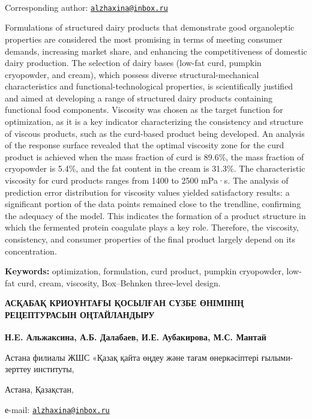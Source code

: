 {\bfseries \textsuperscript{\envelope }}Corresponding author:
\href{mailto:alzhaxina@inbox.ru}{\nolinkurl{alzhaxina@inbox.ru}}

Formulations of structured dairy products that demonstrate good
organoleptic properties are considered the most promising in terms of
meeting consumer demands, increasing market share, and enhancing the
competitiveness of domestic dairy production. The selection of dairy
bases (low-fat curd, pumpkin cryopowder, and cream), which possess
diverse structural-mechanical characteristics and
functional-technological properties, is scientifically justified and
aimed at developing a range of structured dairy products containing
functional food components. Viscosity was chosen as the target function
for optimization, as it is a key indicator characterizing the
consistency and structure of viscous products, such as the curd-based
product being developed. An analysis of the response surface revealed
that the optimal viscosity zone for the curd product is achieved when
the mass fraction of curd is 89.6\%, the mass fraction of cryopowder is
5.4\%, and the fat content in the cream is 31.3\%. The characteristic
viscosity for curd products ranges from 1400 to 2500 mPa·s. The analysis
of prediction error distribution for viscosity values yielded
satisfactory results: a significant portion of the data points remained
close to the trendline, confirming the adequacy of the model. This
indicates the formation of a product structure in which the fermented
protein coagulate plays a key role. Therefore, the viscosity,
consistency, and consumer properties of the final product largely depend
on its concentration.

{\bfseries Keywords:} optimization, formulation, curd product, pumpkin
cryopowder, low-fat curd, cream, viscosity, Box--Behnken three-level
design.

{\bfseries АСҚАБАҚ КРИОҰНТАҒЫ ҚОСЫЛҒАН СҮЗБЕ ӨНІМІНІҢ РЕЦЕПТУРАСЫН
ОҢТАЙЛАНДЫРУ}

{\bfseries Н.E. Альжаксина\textsuperscript{\envelope }, А.Б. Далабаев, И.Е.
Аубакирова, М.С. Мантай}

Астана филиалы ЖШС «Қазақ қайта өңдеу және тағам өнеркәсіптері
ғылыми-зерттеу институты,

Астана, Қазақстан,

е-mail: \href{mailto:alzhaxina@inbox.ru}{\nolinkurl{alzhaxina@inbox.ru}}

